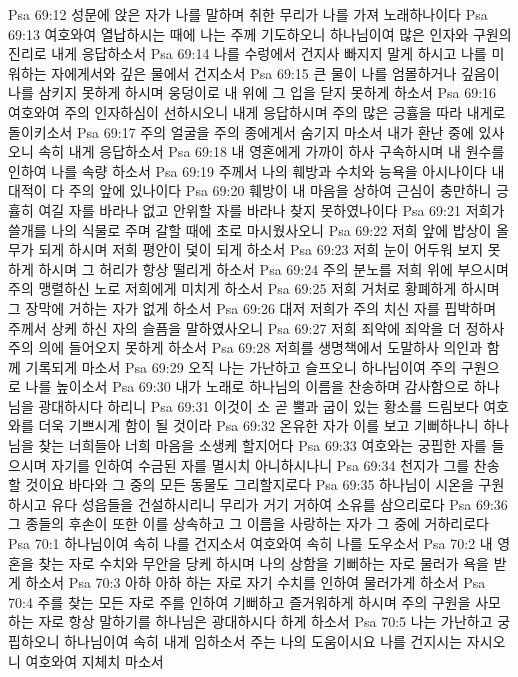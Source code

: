 Psa 69:12  성문에 앉은 자가 나를 말하며 취한 무리가 나를 가져 노래하나이다
Psa 69:13  여호와여 열납하시는 때에 나는 주께 기도하오니 하나님이여 많은 인자와 구원의 진리로 내게 응답하소서
Psa 69:14  나를 수렁에서 건지사 빠지지 말게 하시고 나를 미워하는 자에게서와 깊은 물에서 건지소서
Psa 69:15  큰 물이 나를 엄몰하거나 깊음이 나를 삼키지 못하게 하시며 웅덩이로 내 위에 그 입을 닫지 못하게 하소서
Psa 69:16  여호와여 주의 인자하심이 선하시오니 내게 응답하시며 주의 많은 긍휼을 따라 내게로 돌이키소서
Psa 69:17  주의 얼굴을 주의 종에게서 숨기지 마소서 내가 환난 중에 있사오니 속히 내게 응답하소서
Psa 69:18  내 영혼에게 가까이 하사 구속하시며 내 원수를 인하여 나를 속량 하소서
Psa 69:19  주께서 나의 훼방과 수치와 능욕을 아시나이다 내 대적이 다 주의 앞에 있나이다
Psa 69:20  훼방이 내 마음을 상하여 근심이 충만하니 긍휼히 여길 자를 바라나 없고 안위할 자를 바라나 찾지 못하였나이다
Psa 69:21  저희가 쓸개를 나의 식물로 주며 갈할 때에 초로 마시웠사오니
Psa 69:22  저희 앞에 밥상이 올무가 되게 하시며 저희 평안이 덫이 되게 하소서
Psa 69:23  저희 눈이 어두워 보지 못하게 하시며 그 허리가 항상 떨리게 하소서
Psa 69:24  주의 분노를 저희 위에 부으시며 주의 맹렬하신 노로 저희에게 미치게 하소서
Psa 69:25  저희 거처로 황폐하게 하시며 그 장막에 거하는 자가 없게 하소서
Psa 69:26  대저 저희가 주의 치신 자를 핍박하며 주께서 상케 하신 자의 슬픔을 말하였사오니
Psa 69:27  저희 죄악에 죄악을 더 정하사 주의 의에 들어오지 못하게 하소서
Psa 69:28  저희를 생명책에서 도말하사 의인과 함께 기록되게 마소서
Psa 69:29  오직 나는 가난하고 슬프오니 하나님이여 주의 구원으로 나를 높이소서
Psa 69:30  내가 노래로 하나님의 이름을 찬송하며 감사함으로 하나님을 광대하시다 하리니
Psa 69:31  이것이 소 곧 뿔과 굽이 있는 황소를 드림보다 여호와를 더욱 기쁘시게 함이 될 것이라
Psa 69:32  온유한 자가 이를 보고 기뻐하나니 하나님을 찾는 너희들아 너희 마음을 소생케 할지어다
Psa 69:33  여호와는 궁핍한 자를 들으시며 자기를 인하여 수금된 자를 멸시치 아니하시나니
Psa 69:34  천지가 그를 찬송할 것이요 바다와 그 중의 모든 동물도 그리할지로다
Psa 69:35  하나님이 시온을 구원하시고 유다 성읍들을 건설하시리니 무리가 거기 거하여 소유를 삼으리로다
Psa 69:36  그 종들의 후손이 또한 이를 상속하고 그 이름을 사랑하는 자가 그 중에 거하리로다
Psa 70:1  하나님이여 속히 나를 건지소서 여호와여 속히 나를 도우소서
Psa 70:2  내 영혼을 찾는 자로 수치와 무안을 당케 하시며 나의 상함을 기뻐하는 자로 물러가 욕을 받게 하소서
Psa 70:3  아하 아하 하는 자로 자기 수치를 인하여 물러가게 하소서
Psa 70:4  주를 찾는 모든 자로 주를 인하여 기뻐하고 즐거워하게 하시며 주의 구원을 사모하는 자로 항상 말하기를 하나님은 광대하시다 하게 하소서
Psa 70:5  나는 가난하고 궁핍하오니 하나님이여 속히 내게 임하소서 주는 나의 도움이시요 나를 건지시는 자시오니 여호와여 지체치 마소서
